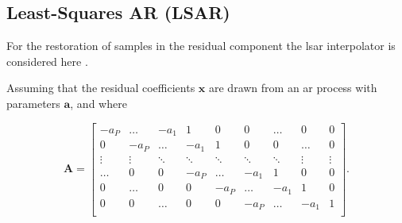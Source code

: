 %
%
%

\subsection{Least-Squares AR (LSAR)}\label{sec:ResidualRestorationLSAR}
For the restoration of samples in the residual component the \gls{lsar} interpolator is considered here \cite{Godsill1998book}.

Assuming that the residual coefficients $\mathbf{x}$ are drawn from an \gls{ar} process with parameters $\mathbf{a}$, and where

\begin{equation}\label{eq:LSAR0} \mathbf{A} =
\begin{bmatrix}
    -a_P    & \ldots & -a_1 & 1 & 0 & 0 & \ldots & 0 & 0 \\
    0       & -a_P & \ldots & -a_1 & 1 & 0 & 0 & \ldots & 0 \\
    \vdots  & \vdots    & \ddots & \ddots & \ddots & \ddots & \ddots & \vdots & \vdots \\
    \ldots  & 0 & 0 & -a_P    & \ldots & -a_1 & 1 & 0 & 0 \\
    0       & \ldots  & 0 & 0 & -a_P    & \ldots & -a_1 & 1 & 0 \\
    0       & 0 & \ldots  & 0 & 0 & -a_P    & \ldots & -a_1 & 1 \\
\end{bmatrix}.
\end{equation}

